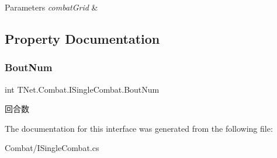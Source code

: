 \begin{DoxyParams}{Parameters}
{\em combat\+Grid} & \\
\hline
\end{DoxyParams}


\subsection{Property Documentation}
\mbox{\label{interface_t_net_1_1_combat_1_1_i_single_combat_a8696c3f6a2760e9b672eb112c8797155}} 
\subsubsection{\texorpdfstring{Bout\+Num}{BoutNum}}
{\footnotesize\ttfamily int T\+Net.\+Combat.\+I\+Single\+Combat.\+Bout\+Num\hspace{0.3cm}{\ttfamily [get]}}



回合数 



The documentation for this interface was generated from the following file\+:\begin{DoxyCompactItemize}
\item 
Combat/I\+Single\+Combat.\+cs\end{DoxyCompactItemize}
